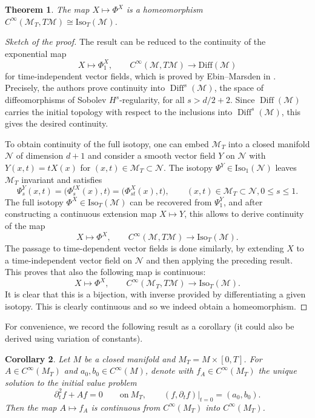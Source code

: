 \documentclass[10pt,a4paper]{amsart}
\numberwithin{equation}{section}
\newtheorem{Theorem}{Theorem}[section]
\newtheorem{Corollary}[Theorem]{Corollary}
\theoremstyle{definition}
\newcommand{\1}{{\bf 1}}
\DeclareMathOperator{\Diff}{Diff}
\begin{document}
\begin{Theorem}\label{thm_isotopies} The map $X\mapsto \Phi^X$ is a homeomorphism $C^\infty(\mathcal M_T,T\mathcal M)\cong \mathrm{Iso}_T(\mathcal M)$.
\end{Theorem}

\begin{proof}[Sketch of the proof]
The result can be reduced to the continuity of the exponential map
\[
	X\mapsto \Phi^X_1,\qquad C^\infty(\mathcal M,T\mathcal M)\rightarrow \mathrm{Diff}(\mathcal M)
\]
for time-independent vector fields, which is proved by Ebin--Marsden in \cite[Theorem 3.1]{EbMa70}. Precisely, the authors prove continuity into $\Diff^s(\mathcal M)$, the space of diffeomorphisms of Sobolev $H^s$-regularity, for all $s>d/2+2$. Since $\Diff(\mathcal M)$ carries the initial topology with respect to the inclusions into $\Diff^s(\mathcal M)$, this gives the desired continuity.

To obtain continuity of the full isotopy, one can embed $\mathcal M_T$ into a closed manifold $\mathcal N$ of dimension $d+1$ and consider a smooth vector field $Y$ on $\mathcal N$ with $Y(x,t)=tX(x)$ for $(x,t)\in \mathcal M_T\subset \mathcal N$. The isotopy $\Psi^Y\in \mathrm{Iso}_1(\mathcal N)$ leaves $\mathcal M_T$ invariant and satisfies
\[\Psi_s^Y(x,t)=\bigl(\Phi_s^{tX}(x),t\bigr)=\bigl(\Phi^X_{st}(x),t\bigr),\qquad (x,t)\in \mathcal M_T\subset \mathcal N, 0\le s \le 1.\]
The full isotopy $\Phi^X\in \mathrm{Iso}_T(\mathcal M)$ can be recovered from $\Psi_1^Y$, and after constructing a continuous extension map $X\mapsto Y$, this allows to derive continuity of the map
\[
 X\mapsto \Phi^X,\qquad C^\infty(\mathcal M,T\mathcal M)\rightarrow \mathrm{Iso}_T(\mathcal M).
\]	
The passage to time-dependent vector fields is done similarly, by extending $X$ to a time-independent vector field on $\mathcal N$ and then applying the preceding result. This proves that also the following map is continuous:
\[
 X\mapsto \Phi^X,\qquad C^\infty(\mathcal M_T,T\mathcal M)\rightarrow \mathrm{Iso}_T(\mathcal M).	
\]
It is clear that this is a bijection, with inverse provided by differentiating a given isotopy. This is clearly continuous and so we indeed obtain a homeomorphism.
\end{proof}

For convenience, we record the following result as a corollary (it could also be derived using variation of constants).

\begin{Corollary}\label{cor_pardep}
Let $M$ be a closed manifold and $M_T=M\times[0,T]$. For $A\in C^\infty(M_T)$ and $a_0,b_0\in C^\infty(M)$, denote with $f_A\in C^\infty(M_T)$ the unique solution to the initial value problem
\[
	\partial_{t}^2f + Af = 0 \qquad\text{on}\  M_T,\qquad (f,\partial_tf)\vert_{t=0} = (a_0,b_0).
\]	
Then the map $A\mapsto f_A$ is continuous from $C^\infty(M_T)$ into $C^\infty(M_T)$.
\end{Corollary}
\end{document}
